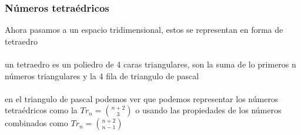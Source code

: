\subsubsection{Números tetraédricos}
Ahora pasamos a un espacio tridimensional, estos se representan en forma de tetraedro
\\
\\un tetraedro es un poliedro de 4 caras triangulares, son la suma de lo primeros n números triangulares y la 4 fila de triangulo de pascal
\\
\\en el triangulo de pascal podemos ver que podemos representar los números tetraédricos como la  $Tr_{n}=\binom{n+2}{3} $ o usando las propiedades de los números combinados como   $Tr_{n}=\binom{n+2}{n-1}$
